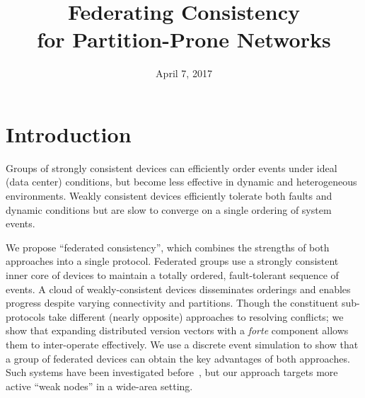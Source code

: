 \documentclass[conference,letterpaper]{IEEEtran}
\begin{document}
\title{Federating Consistency\\ for Partition-Prone Networks}
\date{April 7, 2017}

\author{
}

%

\maketitle

\IEEEdisplaynotcompsoctitleabstractindextext

\section{Introduction}

Groups of strongly consistent devices can efficiently order events under
ideal (data center) conditions, but become less effective in dynamic and
heterogeneous environments.  Weakly consistent devices efficiently
tolerate both faults and dynamic conditions but are slow to converge on a
single ordering of system events.

We propose ``federated consistency'', which combines the strengths of both approaches into
a single protocol.
Federated groups use a strongly consistent inner core of devices to maintain a totally
ordered, fault-tolerant sequence of events.  A cloud of weakly-consistent devices
disseminates orderings and enables progress despite varying connectivity and partitions.
Though the constituent sub-protocols take different (nearly opposite) approaches to
resolving conflicts; we show that expanding distributed version vectors with a
\emph{forte} component allows them to inter-operate effectively.
We use a discrete event simulation to show that a group of federated devices
can obtain the key advantages of both approaches.
Such systems have been investigated
before~\cite{gray_dangers_1996,kubiatowicz_oceanstore:_2000}, but our approach targets
more active ``weak nodes'' in a wide-area setting.
\end{document}
